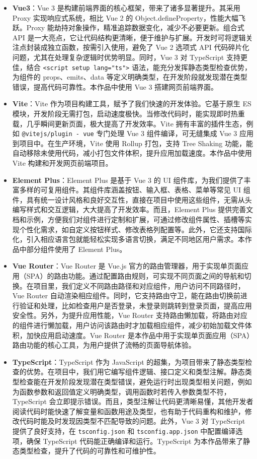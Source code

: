 \documentclass{cumcmthesis}
\numberwithin{equation}{section} %
\numberwithin{figure}{section} %
\numberwithin{table}{section} %
\begin{document}
\begin{itemize}
    \item \textbf{Vue3}：Vue 3 是构建前端界面的核心框架，带来了诸多显著提升。其采用 Proxy 实现响应式系统，相比 Vue 2 的 Object.defineProperty，性能大幅飞跃。Proxy 能劫持对象操作，精准追踪数据变化，减少不必要更新。组合式 API 是一大亮点，它让代码结构更清晰，便于维护与扩展。开发时可将逻辑关注点封装成独立函数，按需引入使用，避免了 Vue 2 选项式 API 代码碎片化问题，尤其在处理复杂逻辑时优势明显。同时，Vue 3 对 TypeScript 支持更佳，结合 \texttt{<script setup lang="ts">} 语法，能充分发挥静态类型检查优势，为组件的 props、emits、data 等定义明确类型，在开发阶段就发现潜在类型错误，提高代码可靠性。本作品中使用 Vue 3 搭建网页前端界面。
    \item \textbf{Vite}：Vite 作为项目构建工具，赋予了我们快速的开发体验。它基于原生 ES 模块，开发阶段无需打包，启动速度极快。当修改代码时，能实现即时热重载，几乎瞬间更新页面，极大提高了开发效率。Vite 拥有丰富的插件生态，例如 \texttt{@vitejs/plugin - vue} 专门处理 Vue 3 组件编译，可无缝集成 Vue 3 应用到项目中。在生产环境，Vite 使用 Rollup 打包，支持 Tree Shaking 功能，能自动移除未使用代码，减小打包文件体积，提升应用加载速度。本作品中使用 Vite 构建和开发网页前端项目。
    \item \textbf{Element Plus}：Element Plus 是基于 Vue 3 的 UI 组件库，为我们提供了丰富多样的可复用组件。其组件库涵盖按钮、输入框、表格、菜单等常见 UI 组件，具有统一设计风格和良好交互性，直接在项目中使用这些组件，无需从头编写样式和交互逻辑，大大提高了开发效率。而且，Element Plus 提供完善文档和示例，方便我们对组件进行定制和扩展，可通过修改组件属性、插槽等实现个性化需求，如自定义按钮样式、修改表格列配置等。此外，它还支持国际化，引入相应语言包就能轻松实现多语言切换，满足不同地区用户需求。本作品中部分组件使用了 Element Plus。
    \item \textbf{Vue Router}：Vue Router 是 Vue.js 官方的路由管理器，用于实现单页面应用（SPA）的路由功能。通过配置路由规则，可实现不同页面之间的导航和切换。在项目里，我们定义不同路由路径和对应组件，用户访问不同路径时，Vue Router 自动渲染相应组件。同时，它支持路由守卫，能在路由切换前进行验证和处理，比如检查用户是否登录，未登录则跳转到登录页面，提高应用安全性。另外，为提升应用性能，Vue Router 支持路由懒加载，将路由对应的组件进行懒加载，用户访问该路由时才加载相应组件，减少初始加载文件体积，加快应用启动速度。Vue Router 是本作品中用于实现单页面应用（SPA）路由功能的核心工具，为用户提供了流畅的页面导航体验。
    \item \textbf{TypeScript}：TypeScript 作为 JavaScript 的超集，为项目带来了静态类型检查的优势。在项目中，我们用它编写组件逻辑、接口定义和类型注解。静态类型检查能在开发阶段发现潜在类型错误，避免运行时出现类型相关问题，例如为函数参数和返回值定义明确类型，调用函数时若传入参数类型不符，TypeScript 会立即提示错误。而且，类型注解让代码更清晰易懂，其他开发者阅读代码时能快速了解变量和函数用途及类型，也有助于代码重构和维护，修改代码时能及时发现因类型不匹配导致的问题。此外，Vue 3 对 TypeScript 提供了良好支持，在 \texttt{tsconfig.json} 和 \texttt{tsconfig.app.json} 中配置编译选项，确保 TypeScript 代码能正确编译和运行。TypeScript 为本作品带来了静态类型检查，提升了代码的可靠性和可维护性。
\end{itemize}
\end{document}
